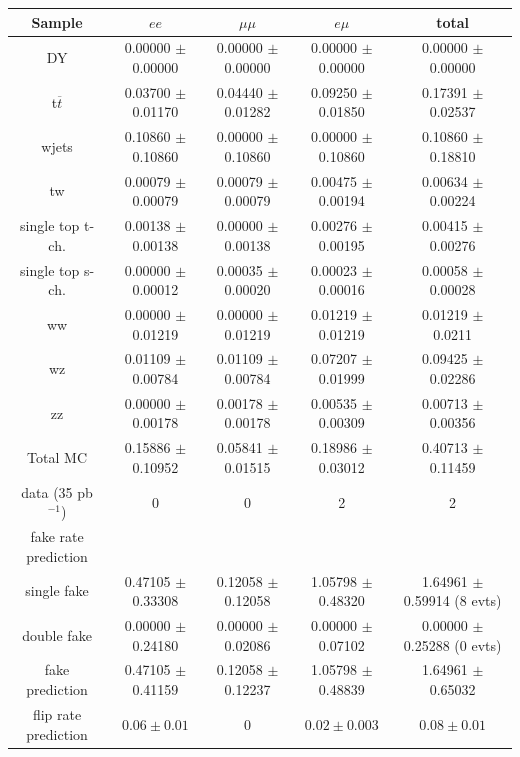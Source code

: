 \vspace{6 mm}
\begin{table}[htb]
\begin{center}
\begin{tabular}{|c|c|c|c|c|}
\hline
Sample & $ee$    & $\mu\mu$ & $e\mu$      & total \\ \hline
\hline
DY  & 0.00000 $\pm$ 0.00000 & 0.00000 $\pm$ 0.00000 & 0.00000 $\pm$ 0.00000 & 0.00000 $\pm$ 0.00000 \\ 
t$\overline{t}$  & 0.03700 $\pm$ 0.01170 & 0.04440 $\pm$ 0.01282 & 0.09250 $\pm$ 0.01850 & 0.17391 $\pm$ 0.02537 \\ 
wjets  & 0.10860 $\pm$ 0.10860 & 0.00000 $\pm$ 0.10860 & 0.00000 $\pm$ 0.10860 & 0.10860 $\pm$ 0.18810 \\ 
tw  & 0.00079 $\pm$ 0.00079 & 0.00079 $\pm$ 0.00079 & 0.00475 $\pm$ 0.00194 & 0.00634 $\pm$ 0.00224 \\ 
single top t-ch.  & 0.00138 $\pm$ 0.00138 & 0.00000 $\pm$ 0.00138 & 0.00276 $\pm$ 0.00195 & 0.00415 $\pm$ 0.00276 \\ 
single top s-ch.  & 0.00000 $\pm$ 0.00012 & 0.00035 $\pm$ 0.00020 & 0.00023 $\pm$ 0.00016 & 0.00058 $\pm$ 0.00028\\ 
ww  & 0.00000 $\pm$ 0.01219 & 0.00000 $\pm$ 0.01219 & 0.01219 $\pm$ 0.01219 & 0.01219 $\pm$ 0.0211 \\ 
wz  & 0.01109 $\pm$ 0.00784 & 0.01109 $\pm$ 0.00784 & 0.07207 $\pm$ 0.01999 & 0.09425 $\pm$ 0.02286 \\ 
zz  & 0.00000 $\pm$ 0.00178 & 0.00178 $\pm$ 0.00178 & 0.00535 $\pm$ 0.00309 & 0.00713 $\pm$ 0.00356 \\ 
\hline
Total MC  & 0.15886 $\pm$ 0.10952 & 0.05841 $\pm$ 0.01515 & 0.18986 $\pm$ 0.03012 & 0.40713 $\pm$ 0.11459 \\
\hline\hline
data  (35 pb$^{-1}$)     & 0  &  0  & 2  & 2      \\ \hline
fake rate prediction & & & & \\ \hline
single fake   & 0.47105 $\pm$ 0.33308 & 0.12058 $\pm$ 0.12058 & 1.05798 $\pm$ 0.48320 & 1.64961 $\pm$ 0.59914 (8 evts) \\
double fake   & 0.00000 $\pm$ 0.24180 & 0.00000 $\pm$ 0.02086 & 0.00000 $\pm$ 0.07102 & 0.00000 $\pm$ 0.25288 (0 evts) \\
fake prediction & 0.47105 $\pm$ 0.41159 & 0.12058 $\pm$ 0.12237 & 1.05798 $\pm$ 0.48839 & 1.64961 $\pm$ 0.65032 \\
\hline
flip rate prediction & $0.06\pm 0.01$ & 0 & $0.02\pm 0.003$ & $0.08\pm 0.01$ \\ \hline\hline

\end{tabular}
\end{center}
\end{table}
